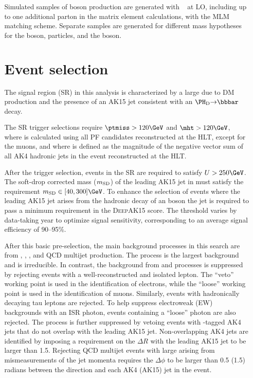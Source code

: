 Simulated samples of \darkHiggs boson production are generated with \MGvATNLO~\cite{MADGRAPH} at LO, including up to one additional parton in the matrix element calculations, with the MLM matching scheme. Separate samples are generated for different mass hypotheses for the \PZpr boson, \PGc particles, and the \darkHiggs boson.

\section{Event selection}
\label{selection}

The signal region (SR) in this analysis is characterized by a large \recoil due to DM production and the presence of an AK15 jet consistent with an $\darkHiggs {\to} \bbbar$ decay.

The SR trigger selections require $\ptmiss > 120\GeV$ and $\mht > 120\GeV$, where \ptmiss is calculated using all PF candidates reconstructed at the HLT, except for the muons, and where \mht is defined as the magnitude of the negative vector \ptvec sum of all AK4 hadronic jets in the event reconstructed at the HLT.  

After the trigger selection, events in the SR are required to satisfy $\recoil > 250\GeV$. The soft-drop corrected mass ($m_{\mathrm{SD}}$) of the leading AK15 jet in \pt must satisfy the requirement $\mSD\in[40,300]\GeV$. To enhance the selection of events where the leading AK15 jet arises from the hadronic decay of an \darkHiggs boson the jet is required to pass a minimum requirement in the  \textsc{DeepAK15} score. The threshold varies by data-taking year to optimize signal sensitivity, corresponding to an average signal efficiency of 90–95\%.


After this basic pre-selection, the main background processes in this search are from \Zjets, \Wjets, \ttbar, and QCD multijet production. The \Zjets process is the largest background and is irreducible. In contrast, the background from \Wjets and \ttbar processes is suppressed by rejecting events with a well-reconstructed and isolated lepton. The ``veto'' working point is used in the identification of electrons, while the ``loose'' working point is used in the identification of muons. Similarly, events with hadronically decaying tau leptons are rejected. To help suppress electroweak (EW) backgrounds with an ISR photon, events containing a ``loose'' photon are also rejected. The \ttbar process is further suppressed by vetoing events with \PQb-tagged AK4 jets that do not overlap with the leading AK15 jet. Non-overlapping AK4 jets are identified by imposing a requirement on the $\Delta R$ with the leading AK15 jet to be larger than 1.5.
Rejecting QCD multijet events with large \recoil arising from mismeasurements of the jet momenta requires the $\Delta\phi$ to be larger than 0.5 (1.5) radians between the \recoilvec direction and each AK4 (AK15) jet in the event.

